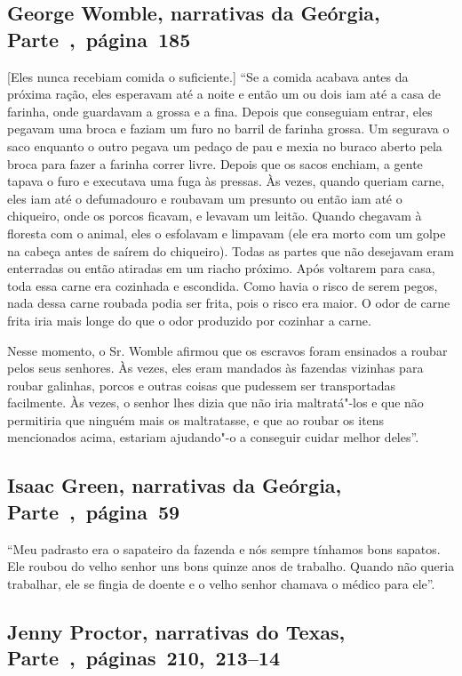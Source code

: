 \subsection{George Womble, narrativas da Geórgia, Parte~,~página~185}
\label{ref310}

{[}Eles nunca recebiam comida o suficiente.{]} ``Se a comida acabava
antes da próxima ração, eles esperavam até a noite e então um ou dois
iam até a casa de farinha, onde guardavam a grossa e a fina. Depois que
conseguiam entrar, eles pegavam uma broca e faziam um furo no barril de
farinha grossa. Um segurava o saco enquanto o outro pegava um pedaço de
pau e mexia no buraco aberto pela broca para fazer a farinha correr
livre. Depois que os sacos enchiam, a gente tapava o furo e executava
uma fuga às pressas. Às vezes, quando queriam carne, eles iam até o
defumadouro e roubavam um presunto ou então iam até o chiqueiro, onde os
porcos ficavam, e levavam um leitão. Quando chegavam à floresta com o
animal, eles o esfolavam e limpavam (ele era morto com um golpe na
cabeça antes de saírem do chiqueiro). Todas as partes que não desejavam
eram enterradas ou então atiradas em um riacho próximo. Após voltarem
para casa, toda essa carne era cozinhada e escondida. Como havia o risco
de serem pegos, nada dessa carne roubada podia ser frita, pois o risco
era maior. O odor de carne frita iria mais longe do que o odor produzido
por cozinhar a carne.

Nesse momento, o Sr. Womble afirmou que os escravos foram ensinados a
roubar pelos seus senhores. Às vezes, eles eram mandados às fazendas
vizinhas para roubar galinhas, porcos e outras coisas que pudessem ser
transportadas facilmente. Às vezes, o senhor lhes dizia que não iria
maltratá"-los e que não permitiria que ninguém mais os maltratasse, e que
ao roubar os itens mencionados acima, estariam ajudando"-o a conseguir
cuidar melhor deles''.

\subsection{Isaac Green, narrativas da Geórgia, Parte~,~página~59}
\label{ref113}

``Meu padrasto era o sapateiro da fazenda e nós sempre tínhamos bons
sapatos. Ele roubou do velho senhor uns bons quinze anos de trabalho.
Quando não queria trabalhar, ele se fingia de doente e o velho senhor
chamava o médico para ele''.

\subsection{Jenny Proctor, narrativas do Texas, Parte~,~páginas~210,~213--14}
\label{ref219}

